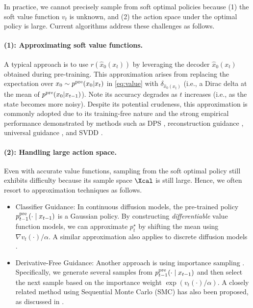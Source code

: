 In practice, we cannot precisely sample from soft optimal policies because (1) the soft value function $v_t$ is unknown, and (2) the action space under the optimal policy is large. Current algorithms address these challenges as follows.

\vspace{-2mm}
\paragraph{(1): Approximating soft value functions.}\label{sec:approximate_soft}

A typical approach is to use $r(\hat x_0(x_t))$ by leveraging the decoder $\hat x_0(x_t)$ obtained during pre-training. This approximation arises from replacing the expectation over $x_0\sim p^{\mathrm{pre}}(x_0|x_{t})$ in \eqref{eq:value} with $\delta_{\hat x_0(x_t)}$ (i.e., a Dirac delta at the mean of $p^{\mathrm{pre}}(x_0|x_{t-1})$). Note its accuracy degrades as $t$ increases (i.e., as the state becomes more noisy). Despite its potential crudeness, this approximation is commonly adopted due to its training-free nature and the strong empirical performance demonstrated by methods such as DPS \citep{chung2022diffusion}, reconstruction guidance \citep{ho2022video}, universal guidance \citep{bansal2023universal}, and SVDD \citep{li2024derivative}.

\vspace{-2mm}
\paragraph{(2): Handling large action space.} 

Even with accurate value functions, sampling from the soft optimal policy still exhibits difficulty because its sample space $\Xcal$ is still large. Hence, we often resort to approximation techniques as follows.
\vspace{-1mm}
\begin{itemize}
    \item  Classifier Guidance: In continuous diffusion models, the pre-trained policy $p^{\mathrm{pre}}_{t-1}(\cdot \mid x_{t-1})$ is a Gaussian policy. By constructing \emph{differentiable} value function models, we can approximate $p^{\star}_{t}$ by shifting the mean using $\nabla v_t(\cdot)/\alpha$. A similar approximation also applies to discrete diffusion models \citep{nisonoff2024unlocking}.
\item Derivative-Free Guidance: Another approach is using importance sampling \citep{li2024derivative}. Specifically, we generate several samples from $p^{\mathrm{pre}}_{t-1}(\cdot \mid x_{t-1})$ and then select the next sample based on the importance weight $\exp\left(v_{t}(\cdot)/\alpha\right)$. A closely related method using Sequential Monte Carlo (SMC) has also been proposed, as discussed in .
\end{itemize}